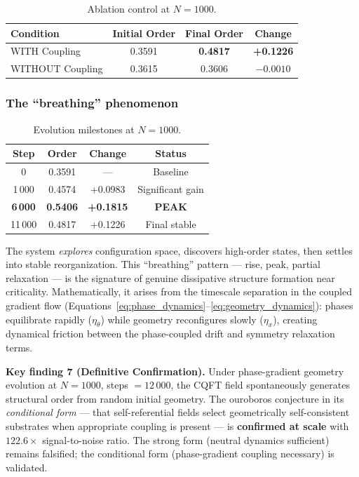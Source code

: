 \documentclass[12pt,a4paper]{article}
\theoremstyle{plain}
\theoremstyle{definition}
\begin{document}
\begin{table}[H]
\centering
\caption{Ablation control at $N=1000$.}
\label{tab:ablation1000}
\begin{tabular}{lccc}
\toprule
\textbf{Condition} & \textbf{Initial Order} & \textbf{Final Order} &
  \textbf{Change} \\
\midrule
WITH Coupling    & 0.3591 & \textbf{0.4817} & \textbf{+0.1226} \\
WITHOUT Coupling & 0.3615 & 0.3606          & $-0.0010$ \\
\bottomrule
\end{tabular}
\end{table}

\subsubsection{The ``breathing'' phenomenon}

\begin{table}[H]
\centering
\caption{Evolution milestones at $N=1000$.}
\label{tab:milestones}
\begin{tabular}{cccc}
\toprule
\textbf{Step} & \textbf{Order} & \textbf{Change} & \textbf{Status} \\
\midrule
0              & 0.3591          & ---             & Baseline \\
1\,000         & 0.4574          & +0.0983         & Significant gain \\
\textbf{6\,000}& \textbf{0.5406} & \textbf{+0.1815}& \textbf{PEAK} \\
11\,000        & 0.4817          & +0.1226         & Final stable \\
\bottomrule
\end{tabular}
\end{table}

The system \emph{explores} configuration space, discovers high-order
states, then settles into stable reorganization. This ``breathing''
pattern --- rise, peak, partial relaxation --- is the signature of genuine
dissipative structure formation near criticality. Mathematically, it
arises from the timescale separation in the coupled gradient flow
(Equations~\ref{eq:phase_dynamics}--\ref{eq:geometry_dynamics}): phases
equilibrate rapidly ($\eta_\theta$) while geometry reconfigures slowly
($\eta_x$), creating dynamical friction between the phase-coupled drift
and symmetry relaxation terms.

\begin{keyresult}
\textbf{Key finding 7 (Definitive Confirmation).} Under phase-gradient
geometry evolution at $N = 1000$, steps $= 12\,000$, the CQFT field
spontaneously generates structural order from random initial geometry.
The ouroboros conjecture in its \emph{conditional form} --- that
self-referential fields select geometrically self-consistent substrates
when appropriate coupling is present --- is \textbf{confirmed at scale}
with $122.6\times$ signal-to-noise ratio. The strong form (neutral
dynamics sufficient) remains falsified; the conditional form
(phase-gradient coupling necessary) is validated.
\end{keyresult}
\end{document}
